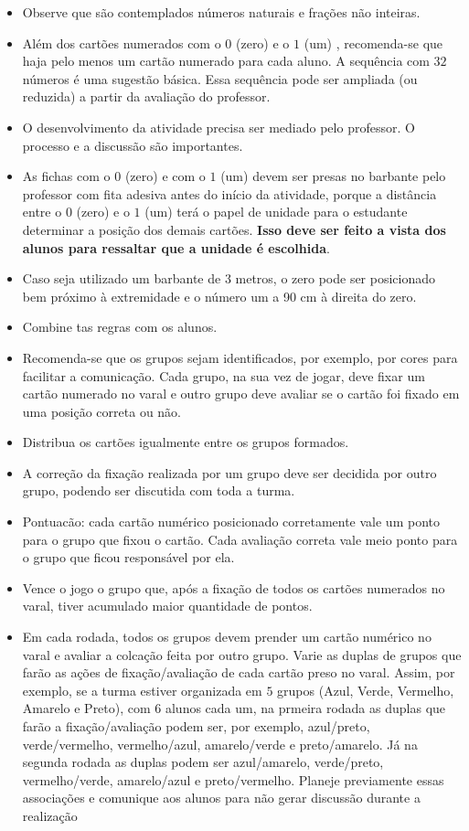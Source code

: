 \documentclass[oneside]{book}
\begin{document}
\begin{multicols}{2}
\begin{itemize}
  \item Observe que são contemplados números naturais e frações não inteiras. 
  \item Além dos cartões numerados com o $0$ (zero) e o $1$ (um) , recomenda-se que haja pelo menos um cartão numerado para cada aluno. A sequência com $32$ números é uma sugestão básica. Essa sequência pode ser ampliada (ou reduzida) a partir da avaliação do professor. 
\end{itemize} %

\begin{itemize}
  \item O desenvolvimento da atividade precisa ser mediado pelo professor. O processo e a discussão são importantes.
  \item As fichas com o $0$ (zero) e com o $1$ (um) devem ser presas no barbante pelo professor com fita adesiva antes do início da atividade, porque a distância entre o $0$ (zero) e o $1$ (um) terá o papel de unidade para o estudante determinar a posição dos demais cartões. {\bf Isso deve ser feito a vista dos alunos para ressaltar que a unidade é escolhida}. 
  \item Caso seja utilizado um barbante de $3$ metros, o zero pode ser posicionado bem próximo à extremidade e o número um a 90 cm à direita do zero.
  \item Combine tas regras com os alunos.
  \item Recomenda-se que os grupos sejam identificados, por exemplo, por cores para facilitar a comunicação. Cada grupo, na sua vez de jogar, deve fixar um cartão numerado no varal e outro grupo deve avaliar se o cartão foi fixado em uma posição correta ou não.
  \item Distribua os cartões igualmente entre os grupos formados. 
  \item A correção da fixação realizada por um grupo deve ser decidida por outro grupo, podendo ser discutida com toda a turma. 
  \item Pontuacão: cada cartão numérico posicionado corretamente vale um ponto para o grupo que fixou o cartão. Cada avaliação correta vale meio ponto para o grupo que ficou responsável por ela. 
  \item Vence o jogo o grupo que, após a fixação de todos os cartões numerados no varal, tiver acumulado maior quantidade de pontos. 
  \item Em cada rodada, todos os grupos devem prender um cartão numérico no varal e avaliar a colcação feita por outro grupo. Varie as duplas de grupos que farão as ações de fixação/avaliação de cada cartão preso no varal. Assim, por exemplo, se a turma estiver organizada em $5$ grupos (Azul, Verde, Vermelho, Amarelo e Preto), com 6 alunos cada um, na prmeira rodada as duplas que farão a fixação/avaliação podem ser, por exemplo, azul/preto, verde/vermelho, vermelho/azul, amarelo/verde e preto/amarelo. Já na segunda rodada as duplas podem ser azul/amarelo, verde/preto, vermelho/verde, amarelo/azul e preto/vermelho. Planeje previamente essas associações e comunique aos alunos para não gerar discussão durante a realização 

\end{itemize}
\end{multicols}
\end{document}
